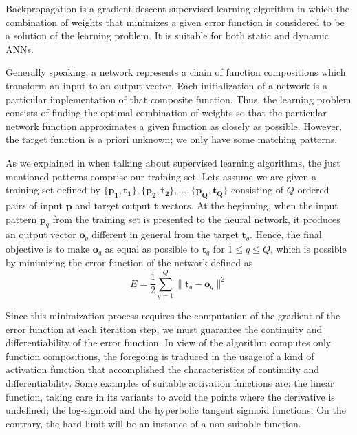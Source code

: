 
\label{sec:generalbackprop}

Backpropagation is a gradient-descent supervised learning algorithm 
in which the combination of weights that minimizes a given error function is considered to be a solution of the learning problem. It is suitable for both static and dynamic ANNs.

Generally speaking, a network represents a chain of function compositions which transform an input to an output vector. Each initialization of a network is a particular implementation
of that composite function. Thus, the learning problem consists of finding the optimal combination of weights so that the particular network function approximates a given function as closely as possible. However, the target function is a priori unknown; we only have some matching patterns.

As we explained in  when talking about supervised learning algorithms, the just mentioned patterns comprise our training set. Lets assume we are given a training set defined by $\{\mathbf{p_{1}} , \mathbf{t_{1}} \}, \{\mathbf{p_{2}} , \mathbf{t_{2}}\}, ...,
 \{\mathbf{p_{Q}} , \mathbf{t_{Q}} \}$
consisting of $Q$ ordered pairs of input $\mathbf{p}$ and target output $\mathbf{t}$ vectors.
At the beginning, 
when the input pattern $\mathbf{p}_{q}$ from the training set is presented to the neural network,
it produces an output vector $\mathbf{o}_{q}$ different in general from the target $\mathbf{t}_{q}$.
Hence, the final objective is to make $\mathbf{o}_{q}$ as equal as possible to $\mathbf{t}_{q}$ for $1 \leq q \leq Q$, which is possible by minimizing the error function of the network defined as
\begin{equation}
E=\frac{1}{2}\sum_{q=1}^{Q}
\parallel \mathbf{t}_{q}-\mathbf{o}_{q} \parallel^2
\label{eq:globalerrorfunction}
\end{equation}

Since this minimization process requires the computation of the gradient of the error function at each iteration step,
we must guarantee the continuity and differentiability of the error function.
In view of the algorithm computes only function compositions, 
the foregoing is traduced in the usage of a kind of activation function that accomplished the characteristics of continuity and differentiability. 
Some examples of suitable activation functions are: 
the linear function, taking care in its variants to avoid the points where the derivative is undefined; 
the log-sigmoid and the hyperbolic tangent sigmoid functions. 
On the contrary, the hard-limit will be an instance of a non suitable function.

